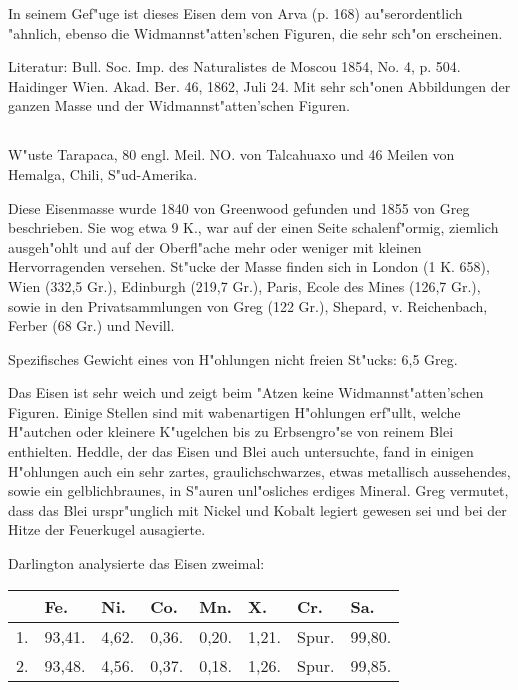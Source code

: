 \documentclass[a4paper, 11pt, oneside]{article}
\begin{document}
In seinem Gef"uge ist dieses Eisen dem von Arva (p. 168) au"serordentlich "ahnlich, ebenso die Widmannst"atten'schen Figuren, die sehr sch"on erscheinen.

\normalsize
Literatur: Bull. Soc. Imp. des Naturalistes de Moscou 1854, No. 4, p. 504. Haidinger Wien. Akad. Ber. 46, 1862, Juli 24. Mit sehr sch"onen Abbildungen der ganzen Masse und der Widmannst"atten'schen Figuren.

\subsection{}
\LARGE
\paragraph{}
W"uste Tarapaca, 80 engl. Meil. NO. von Talcahuaxo und 46 Meilen von Hemalga, Chili, S"ud-Amerika.

Diese Eisenmasse wurde 1840 von Greenwood gefunden und 1855 von Greg beschrieben. Sie wog etwa 9 K., war auf der einen Seite schalenf"ormig, ziemlich ausgeh"ohlt und auf der Oberfl"ache mehr oder weniger mit kleinen Hervorragenden versehen. St"ucke der Masse finden sich in London (1 K. 658), Wien (332,5 Gr.), Edinburgh (219,7 Gr.), Paris, Ecole des Mines (126,7 Gr.), sowie in den Privatsammlungen von Greg (122 Gr.), Shepard, v. Reichenbach, Ferber (68 Gr.) und Nevill.

Spezifisches Gewicht eines von H"ohlungen nicht freien St"ucks: 6,5 Greg.

Das Eisen ist sehr weich und zeigt beim "Atzen keine Widmannst"atten'schen Figuren. Einige Stellen sind mit wabenartigen H"ohlungen erf"ullt, welche H"autchen oder kleinere K"ugelchen bis zu Erbsengro"se von reinem Blei enthielten. Heddle, der das Eisen und Blei auch untersuchte, fand in einigen H"ohlungen auch ein sehr zartes, graulichschwarzes, etwas metallisch aussehendes, sowie ein gelblichbraunes, in S"auren unl"osliches erdiges Mineral. Greg vermutet, dass das Blei urspr"unglich mit Nickel und Kobalt legiert gewesen sei und bei der Hitze der Feuerkugel ausagierte.

Darlington analysierte das Eisen zweimal:
\begin{table}[H]
    \centering\swabfamily\Large
    \begin{tabular}{l l l l l l l l}
         & Fe. & Ni. & Co. & Mn. & X. & Cr. & Sa. \\ \hline
        1. & 93,41. & 4,62. & 0,36. & 0,20. & 1,21. & Spur. & 99,80. \\
        2. & 93,48. & 4,56. & 0,37. & 0,18. & 1,26. & Spur. & 99,85. \\
    \end{tabular}
\end{table}
\end{document}
